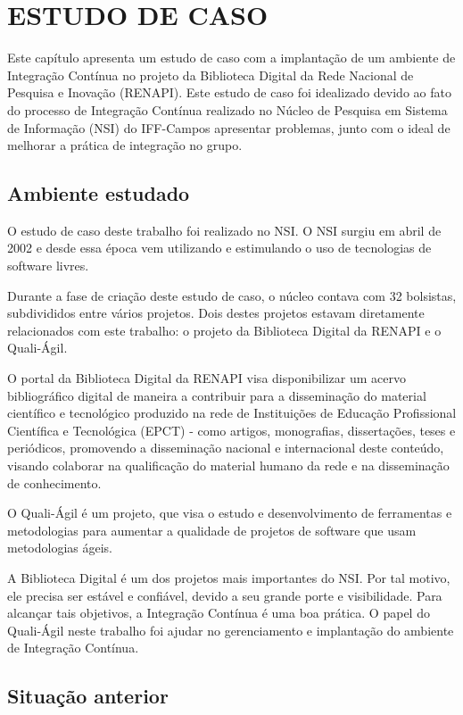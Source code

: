 \chapter{ESTUDO DE CASO}

Este capítulo apresenta um estudo de caso com a implantação de um ambiente de Integração Contínua no projeto da Biblioteca Digital da Rede Nacional de Pesquisa e Inovação (RENAPI). Este estudo de caso foi idealizado devido ao fato do processo de Integração Contínua realizado no Núcleo de Pesquisa em Sistema de Informação (NSI) do IFF-Campos apresentar problemas, junto com o ideal de melhorar a prática de integração no grupo.

\section{Ambiente estudado}

O estudo de caso deste trabalho foi realizado no NSI. O NSI surgiu em abril de 2002 e desde essa época vem utilizando e estimulando o uso de tecnologias de software livres.

Durante a fase de criação deste estudo de caso, o núcleo contava com 32 bolsistas, subdivididos entre vários projetos. Dois destes projetos estavam diretamente relacionados com este trabalho: o projeto da Biblioteca Digital da RENAPI e o Quali-Ágil.

O portal da Biblioteca Digital da RENAPI visa disponibilizar um acervo bibliográfico digital de maneira a contribuir para a disseminação do material científico e tecnológico produzido na rede de Instituições de Educação Profissional Científica e Tecnológica (EPCT) - como artigos, monografias, dissertações, teses e periódicos, promovendo a disseminação nacional e internacional deste conteúdo, visando colaborar na qualificação do material humano da rede e na disseminação de conhecimento.

O Quali-Ágil é um projeto, que visa o estudo e desenvolvimento de ferramentas e metodologias para aumentar a qualidade de projetos de software que usam metodologias ágeis.

A Biblioteca Digital é um dos projetos mais importantes do NSI. Por tal motivo, ele precisa ser estável e confiável, devido a seu grande porte e visibilidade. Para alcançar tais objetivos, a Integração Contínua é uma boa prática. O papel do Quali-Ágil neste trabalho foi ajudar no gerenciamento e implantação do ambiente de Integração Contínua.

\section{Situação anterior}

